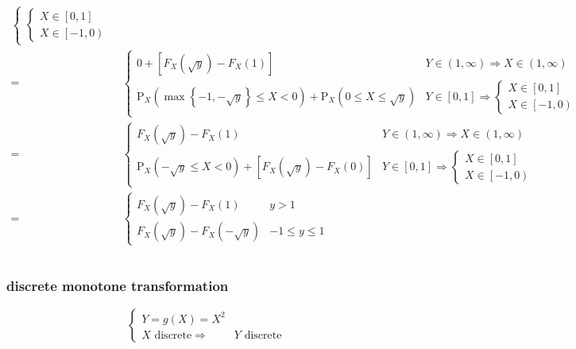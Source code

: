 \documentclass[
]{book}
\theoremstyle{definition}
\theoremstyle{definition}
\theoremstyle{definition}
\theoremstyle{definition}
\theoremstyle{remark}
\begin{document}
\[\begin{aligned}
\begin{cases}
\begin{cases}
X\in\left[0,1\right]\\
X\in\left[-1,0\right)
\end{cases}
\end{cases}\\
= & \begin{cases}
0+\left[F_{{\scriptscriptstyle X}}\left(\sqrt{y}\right)-F_{{\scriptscriptstyle X}}\left(1\right)\right] & Y\in\left(1,\infty\right)\Rightarrow X\in\left(1,\infty\right)\\
\mathrm{P}_{{\scriptscriptstyle X}}\left(\max\left\{ -1,-\sqrt{y}\right\} \le X<0\right)+\mathrm{P}_{{\scriptscriptstyle X}}\left(0\le X\le\sqrt{y}\right) & Y\in\left[0,1\right]\Rightarrow\begin{cases}
X\in\left[0,1\right]\\
X\in\left[-1,0\right)
\end{cases}
\end{cases}\\
= & \begin{cases}
F_{{\scriptscriptstyle X}}\left(\sqrt{y}\right)-F_{{\scriptscriptstyle X}}\left(1\right) & Y\in\left(1,\infty\right)\Rightarrow X\in\left(1,\infty\right)\\
\mathrm{P}_{{\scriptscriptstyle X}}\left(-\sqrt{y}\le X<0\right)+\left[F_{{\scriptscriptstyle X}}\left(\sqrt{y}\right)-F_{{\scriptscriptstyle X}}\left(0\right)\right] & Y\in\left[0,1\right]\Rightarrow\begin{cases}
X\in\left[0,1\right]\\
X\in\left[-1,0\right)
\end{cases}
\end{cases}\\
= & \begin{cases}
F_{{\scriptscriptstyle X}}\left(\sqrt{y}\right)-F_{{\scriptscriptstyle X}}\left(1\right) & y>1\\
F_{{\scriptscriptstyle X}}\left(\sqrt{y}\right)-F_{{\scriptscriptstyle X}}\left(-\sqrt{y}\right) & -1\le y\le1
\end{cases}
\end{aligned}
\]

\[
\tag*{$\Box$}
\]

\subsubsection{discrete monotone transformation}\label{discrete-monotone-transformation}

\[
\begin{cases}
Y=g\left(X\right)=X^{2}\\
X\text{ discrete}\Rightarrow & Y\text{ discrete}
\end{cases}
\]
\end{document}
